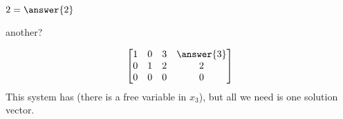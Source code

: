 \documentclass{ximera}
\begin{document}
\begin{example}
  $2 = \answer{2}$

  \begin{question}
    \begin{multipleChoice}
    \end{multipleChoice}

    \begin{feedback}[correct]
      another?
      \begin{multipleChoice}
      \end{multipleChoice} 
    \end{feedback}
  \end{question}

  \begin{question}
    \[
      \begin{bmatrix}
        {1} & 0 & 3 & \answer{3}\\
        0 & {1} & 2 & 2\\
        0 & 0 & 0 & 0
      \end{bmatrix}
    \]
    This system has  (there is a free
    variable in $x_3$), but all we need is one solution vector.

    \begin{multipleChoice}
    \end{multipleChoice} 
  \end{question}
\end{example}
\end{document}
